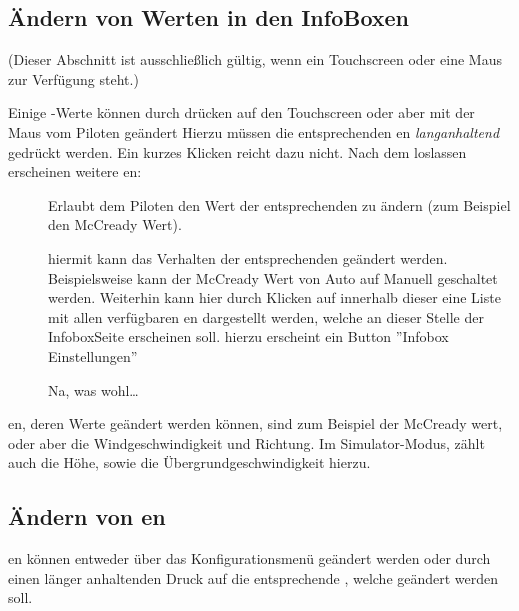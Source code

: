 \subsection*{Ändern von Werten in den InfoBoxen}
(Dieser Abschnitt ist ausschließlich gültig, wenn ein Touchscreen oder eine Maus zur Verfügung steht.)

Einige {\InfoBox}-Werte können durch drücken auf den Touchscreen oder aber mit der Maus vom Piloten geändert
Hierzu müssen die entsprechenden {\InfoBox}en  \emph{langanhaltend} gedrückt werden.
Ein kurzes Klicken reicht dazu nicht.  Nach dem loslassen erscheinen weitere {\InfoBox}en:

\begin{description}
\item[]
Erlaubt dem Piloten den Wert der entsprechenden {\InfoBox} zu ändern (zum Beispiel den McCready Wert).

\item[]
hiermit kann das Verhalten der entsprechenden {\InfoBox} geändert werden. Beispielsweise kann der McCready Wert von Auto auf Manuell geschaltet werden.
Weiterhin kann hier durch Klicken auf   innerhalb dieser {\InfoBox}  eine Liste mit allen verfügbaren {\InfoBox}en dargestellt werden, welche an dieser Stelle der InfoboxSeite erscheinen soll. hierzu erscheint ein Button ''Infobox Einstellungen''

\item[] Na, was wohl\dots
\end{description}

{\InfoBox}en, deren Werte geändert werden können, sind zum Beispiel der McCready wert, oder aber die Windgeschwindigkeit und Richtung. Im Simulator-Modus, zählt auch die Höhe, sowie die Übergrundgeschwindigkeit hierzu.

\subsection*{Ändern von {\InfoBox}en}
{\InfoBox}en können entweder über das Konfigurationsmenü geändert werden 
oder durch einen länger anhaltenden Druck auf die entsprechende  {\InfoBox}, welche geändert werden soll.

